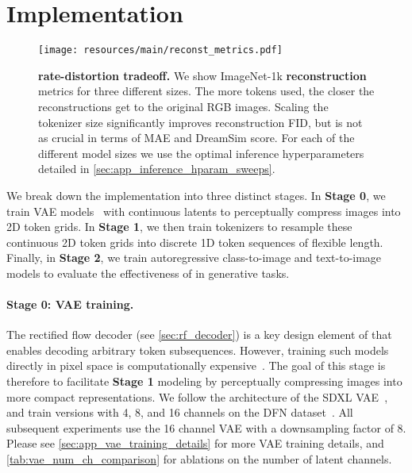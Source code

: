 \section{Implementation}
\label{sec:implementation}

\begin{figure*}[ht!]
\centering
\texttt{[image: resources/main/reconst\_metrics.pdf]}
\vspace{-1.5em}
\caption{\textbf{\ours rate-distortion tradeoff.}
We show ImageNet-1k \textbf{reconstruction} metrics for three different \ours sizes. The more tokens used, the closer the reconstructions get to the original RGB images. Scaling the tokenizer size significantly improves reconstruction FID, but is not as crucial in terms of MAE and DreamSim score. For each of the different \ours model sizes we use the optimal inference hyperparameters detailed in \cref{sec:app_inference_hparam_sweeps}.
}
\label{fig:reconst_rate_distortion}
\vspace{-0.4em}
\end{figure*}

We break down the implementation into three distinct stages. In \textbf{Stage 0}, we train VAE models~\cite{rombach2022high} with continuous latents to perceptually compress images into 2D token grids. In \textbf{Stage 1}, we then train \ours tokenizers to resample these continuous 2D token grids into discrete 1D token sequences of flexible length. Finally, in \textbf{Stage 2}, we train autoregressive class-to-image and text-to-image models to evaluate the effectiveness of \ours in generative tasks.

\paragraph{Stage 0: VAE training.}
The rectified flow decoder (see \cref{sec:rf_decoder}) is a key design element of \ours that enables decoding arbitrary token subsequences. However, training such models directly in pixel space is computationally expensive~\cite{rombach2022high}. The goal of this stage is therefore to facilitate \textbf{Stage 1} modeling by perceptually compressing images into more compact representations. We follow the architecture of the SDXL VAE~\cite{Podell2023SDXL}, and train versions with 4, 8, and 16 channels on the DFN dataset~\cite{dfn_dataset}. All subsequent experiments use the 16 channel VAE with a downsampling factor of 8. Please see \cref{sec:app_vae_training_details} for more VAE training details, and \cref{tab:vae_num_ch_comparison} for ablations on the number of latent channels.

